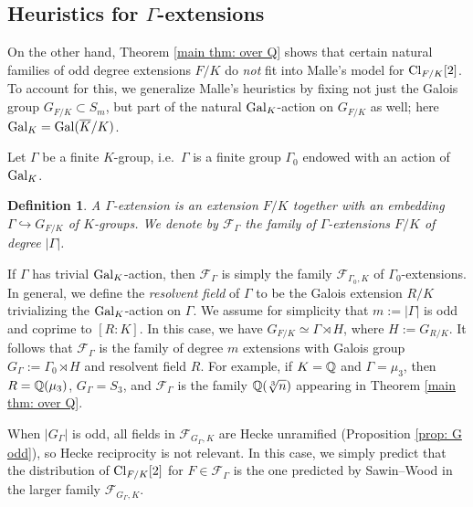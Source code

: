 \documentclass[11pt,a4paper]{amsart}
\def\Q{{\rm \mathbb{Q}}}
\def\Cl{{\rm Cl}}
\def\Gal{{\rm Gal}}
\numberwithin{equation}{section}
\newtheorem{definition}[theorem]{Definition}
\begin{document}
\subsection{Heuristics for $\Gamma$-extensions}\label{subsec: Gamma extension heuristics intro}
On the other hand, Theorem \ref{main thm: over Q} shows that  certain natural families of odd degree extensions $F/K$ do {\it not} fit into Malle's model for $\Cl_{F/K}[2]$. To account for this, we generalize Malle's heuristics by fixing not just the Galois group $G_{F/K} \subset S_m$, but part of the natural $\Gal_K$-action on $G_{F/K}$ as well; here $\Gal_K = \Gal(\overline{K}/K)$. 


Let $\Gamma$ be a finite $K$-group, i.e.\ $\Gamma$ is a finite group $\Gamma_0$ endowed with an action of $\Gal_K$.
\begin{definition} 
{\em 
A {\it $\Gamma$-extension} is an extension $F/K$ together with an embedding $\Gamma \hookrightarrow G_{F/K}$ of $K$-groups.  We denote by $\mathcal{F}_\Gamma$ the family of $\Gamma$-extensions $F/K$ of degree $|\Gamma|$.
}
\end{definition}
 If $\Gamma$ has trivial $\Gal_K$-action, then $\mathcal{F}_\Gamma$ is simply the family $\mathcal{F}_{\Gamma_0, K}$ of  $\Gamma_0$-extensions. In general, we define the {\it resolvent field} of $\Gamma$ to be the Galois extension $R/K$ trivializing the $\Gal_K$-action on $\Gamma$. We assume for simplicity that $m:= |\Gamma|$ is odd and coprime to $[R \colon K]$. In this case, we have $G_{F/K} \simeq \Gamma \rtimes H$, where $H := G_{R/K}$.  It follows that $\mathcal{F}_\Gamma$ is the family of degree $m$ extensions with Galois group $G_\Gamma := \Gamma_0 \rtimes H$ and resolvent field $R$. For example, if $K= \Q$ and $\Gamma = \mu_3$, then $R = \Q(\mu_3)$, $G_\Gamma = S_3$, and $\mathcal{F}_\Gamma$ is the family $\Q(\sqrt[3]{n})$ appearing in Theorem \ref{main thm: over Q}. 

When $|G_\Gamma|$ is odd, all fields in $\mathcal{F}_{G_\Gamma,K}$  are Hecke unramified (Proposition \ref{prop: G odd}), so Hecke reciprocity is not relevant. In this case, we simply predict that the distribution of $\Cl_{F/K}[2]$ for $F \in \mathcal{F}_\Gamma$ is the one predicted by Sawin--Wood in the larger family $\mathcal{F}_{G_\Gamma,K}$. 
\end{document}
